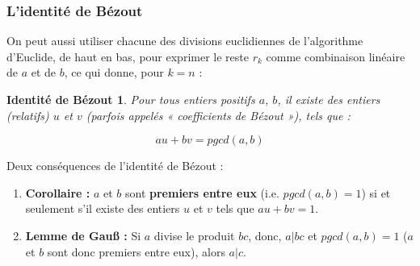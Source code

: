 \newtheorem*{identBezout}{Identité de Bézout}
\subsubsection{L'identité de Bézout}
    On peut aussi utiliser chacune des divisions euclidiennes de l'algorithme
    d'Euclide, de haut en bas, pour exprimer le reste $r_k$ comme combinaison
    linéaire de $a$ et de $b$, ce qui donne, pour $k = n$ :
    
    \begin{identBezout}
        Pour tous entiers positifs $a$, $b$, il existe des entiers (relatifs)
        $u$ et $v$ (parfois appelés « coefficients de Bézout »), tels que :
        
        \[
            au + bv = pgcd(a, b)
        \]
    \end{identBezout}
        
    Deux conséquences de l'identité de Bézout :
        
    \begin{enumerate}
        \item \textbf{Corollaire :} 
            $a$ et $b$ sont \textbf{premiers entre eux} 
            (i.e. $pgcd(a,b) = 1$) si et seulement s'il existe des entiers
            $u$ et $v$ tels que $au + bv = 1$.
        \item \textbf{Lemme de Gauß :}
            Si $a$ divise le produit $bc$, donc, $a | bc$ et $pgcd(a, b) = 1$
            ($a$ et $b$ sont donc premiers entre eux), alors $a | c$.
    \end{enumerate}
    